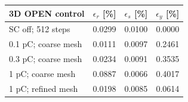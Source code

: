 \begin{tabular}{lrrr}
\toprule
3D OPEN control & $\epsilon_r$ [\%] & $\epsilon_s$ [\%] & $\epsilon_y$ [\%] \\
\midrule
SC off; 512 steps & 0.0299 & 0.0100 & 0.0000 \\
0.1 pC; coarse mesh & 0.0111 & 0.0097 & 0.2461 \\
0.3 pC; coarse mesh & 0.0234 & 0.0091 & 0.3535 \\
1 pC; coarse mesh & 0.0887 & 0.0066 & 0.4017 \\
1 pC; refined mesh & 0.0198 & 0.0085 & 0.0614 \\
\bottomrule
\end{tabular}
